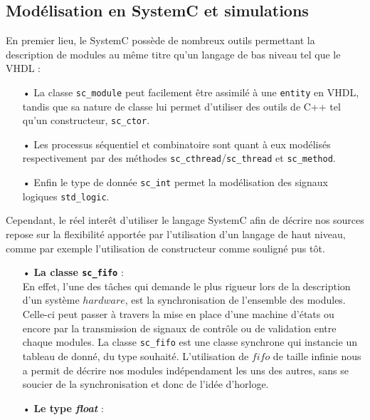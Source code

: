 \documentclass[a4paper,12pt]{article}
\begin{document}
\subsection{Modélisation en SystemC et simulations}
En premier lieu, le SystemC possède de nombreux outils permettant la description de modules au même titre qu'un langage de bas niveau tel que le VHDL :
\begin{itemize}
\item[•] La classe \texttt{sc\_module} peut facilement être assimilé à une \texttt{entity} en VHDL, tandis que sa nature de classe lui permet d'utiliser des outils de C++ tel qu'un constructeur, \texttt{sc\_ctor}.
\item[•] Les processus séquentiel et combinatoire sont quant à eux modélisés respectivement par des méthodes \texttt{sc\_cthread}/\texttt{sc\_thread} et \texttt{sc\_method}.
\item[•] Enfin le type de donnée \texttt{sc\_int} permet la modélisation des signaux logiques \texttt{std\_logic}.
\end{itemize}
Cependant, le réel interêt d'utiliser le langage SystemC afin de décrire nos sources repose sur la flexibilité apportée par l'utilisation d'un langage de haut niveau, comme par exemple l'utilisation de constructeur comme souligné pus tôt.
\begin{itemize}
\item[•] \textbf{La classe \texttt{sc\_fifo}} : \\
En effet, l'une des tâches qui demande le plus rigueur lors de la description d'un système $hardware$, est la synchronisation de l'ensemble des modules. Celle-ci peut passer à travers la mise en place d'une machine d'états ou encore par la transmission de signaux de contrôle ou de validation entre chaque modules. La classe \texttt{sc\_fifo} est une classe synchrone qui instancie un tableau de donné, du type souhaité. L'utilisation de $fifo$ de taille infinie nous a permit de décrire nos modules indépendament les uns des autres, sans se soucier de la synchronisation et donc de l'idée d'horloge.
\item[•] \textbf{Le type \textit{float}} :
\end{itemize}
\end{document}

